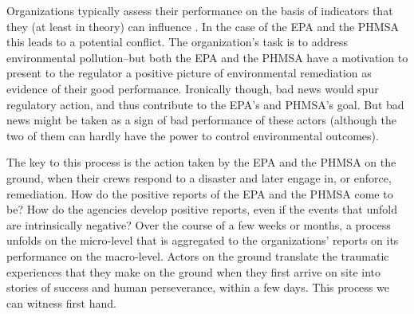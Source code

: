 \documentclass[12pt, man, natbib]{apa6}
\begin{document}
	Organizations typically assess their performance on the basis of indicators that they (at least in theory) can influence \citep{March1963}. In the case of the EPA and the PHMSA this leads to a potential conflict. The organization's task is to address environmental pollution--but both the EPA and the PHMSA have a motivation to present to the regulator a positive picture of environmental remediation as evidence of their good performance. Ironically though, bad news would spur regulatory action, and thus contribute to the EPA's and PHMSA's goal. But bad news might be taken as a sign of bad performance of these actors (although the two of them can hardly have the power to control environmental outcomes).
	
	The key to this process is the action taken by the EPA and the PHMSA on the ground, when their crews respond to a disaster and later engage in, or enforce, remediation. How do the positive reports of the EPA and the PHMSA come to be? How do the agencies develop positive reports, even if the events that unfold are intrinsically negative? Over the course of a few weeks or months, a process unfolds on the micro-level that is aggregated to the organizations' reports on its performance on the macro-level. Actors on the ground translate the traumatic experiences that they make on the ground when they first arrive on site into stories of success and human perseverance, within a few days. This process we can witness first hand.
	

\end{document}

